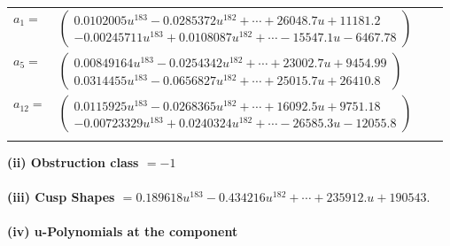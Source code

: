 \documentclass[1p]{elsarticle_modified}
\theoremstyle{definition}
\begin{document}
\begin{tabular}{m{7pt} m{180pt} m{7pt} m{180pt} }
\flushright $a_{1}=$&$\begin{pmatrix}0.0102005 u^{183}-0.0285372 u^{182}+\cdots+26048.7 u+11181.2\\-0.00245711 u^{183}+0.0108087 u^{182}+\cdots-15547.1 u-6467.78\end{pmatrix}$ \\
\flushright $a_{5}=$&$\begin{pmatrix}0.00849164 u^{183}-0.0254342 u^{182}+\cdots+23002.7 u+9454.99\\0.0314455 u^{183}-0.0656827 u^{182}+\cdots+25015.7 u+26410.8\end{pmatrix}$ \\
\flushright $a_{12}=$&$\begin{pmatrix}0.0115925 u^{183}-0.0268365 u^{182}+\cdots+16092.5 u+9751.18\\-0.00723329 u^{183}+0.0240324 u^{182}+\cdots-26585.3 u-12055.8\end{pmatrix}$\\&\end{tabular}
\flushleft \textbf{(ii) Obstruction class $= -1$}\\~\\
\flushleft \textbf{(iii) Cusp Shapes $= 0.189618 u^{183}-0.434216 u^{182}+\cdots+235912. u+190543.$}\\~\\
\newpage\renewcommand{\arraystretch}{1}
\flushleft \textbf{(iv) u-Polynomials at the component}\newline \\
\end{document}
